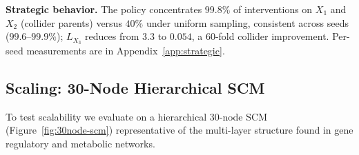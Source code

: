 \documentclass{article}
\theoremstyle{plain}
\theoremstyle{definition}
\theoremstyle{remark}
\begin{document}
\textbf{Strategic behavior.} The policy concentrates $99.8\%$ of interventions on $X_1$ and $X_2$ (collider parents) versus $40\%$ under uniform sampling, consistent across seeds ($99.6$--$99.9\%$); $L_{X_3}$ reduces from $3.3$ to $0.054$, a $60$-fold collider improvement. Per-seed measurements are in Appendix~\ref{app:strategic}.

\subsection{Scaling: 30-Node Hierarchical SCM}
\label{sec:results-scale}

To test scalability we evaluate on a hierarchical 30-node SCM (Figure~\ref{fig:30node-scm}) representative of the multi-layer structure found in gene regulatory and metabolic networks.
\end{document}
